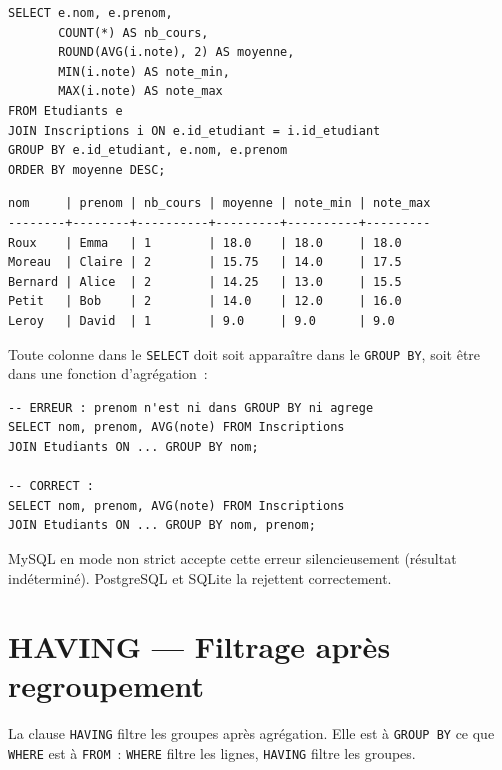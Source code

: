 \begin{codeblock}[title=\textbf{Moyenne par \'etudiant}]
\begin{verbatim}
SELECT e.nom, e.prenom,
       COUNT(*) AS nb_cours,
       ROUND(AVG(i.note), 2) AS moyenne,
       MIN(i.note) AS note_min,
       MAX(i.note) AS note_max
FROM Etudiants e
JOIN Inscriptions i ON e.id_etudiant = i.id_etudiant
GROUP BY e.id_etudiant, e.nom, e.prenom
ORDER BY moyenne DESC;
\end{verbatim}
\end{codeblock}

\begin{codeoutput}
\begin{verbatim}
nom     | prenom | nb_cours | moyenne | note_min | note_max
--------+--------+----------+---------+----------+---------
Roux    | Emma   | 1        | 18.0    | 18.0     | 18.0
Moreau  | Claire | 2        | 15.75   | 14.0     | 17.5
Bernard | Alice  | 2        | 14.25   | 13.0     | 15.5
Petit   | Bob    | 2        | 14.0    | 12.0     | 16.0
Leroy   | David  | 1        | 9.0     | 9.0      | 9.0
\end{verbatim}
\end{codeoutput}

\begin{antipattern}[title=\textbf{Colonne hors GROUP BY sans agr\'egation}]
Toute colonne dans le \texttt{SELECT} doit soit appara\^itre dans le
\texttt{GROUP BY}, soit \^etre dans une fonction d'agr\'egation~:
\begin{verbatim}
-- ERREUR : prenom n'est ni dans GROUP BY ni agrege
SELECT nom, prenom, AVG(note) FROM Inscriptions
JOIN Etudiants ON ... GROUP BY nom;

-- CORRECT :
SELECT nom, prenom, AVG(note) FROM Inscriptions
JOIN Etudiants ON ... GROUP BY nom, prenom;
\end{verbatim}
MySQL en mode non strict accepte cette erreur silencieusement (r\'esultat
ind\'etermin\'e). PostgreSQL et SQLite la rejettent correctement.
\end{antipattern}

\section{HAVING --- Filtrage apr\`es regroupement}

\begin{definition}[HAVING]
La clause \texttt{HAVING} filtre les groupes apr\`es agr\'egation. Elle est
\`a \texttt{GROUP BY} ce que \texttt{WHERE} est \`a \texttt{FROM}~:
\texttt{WHERE} filtre les lignes, \texttt{HAVING} filtre les groupes.
\end{definition}

